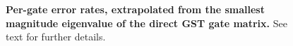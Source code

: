 {\begin{figure}
\begin{center}
\caption{\textbf{Per-gate error rates, extrapolated from the smallest magnitude eigenvalue of the direct GST gate matrix.}  See text for further details.\label{smallEvalErrRateBoxPlot}}
\end{center}
\end{figure}


}{}


